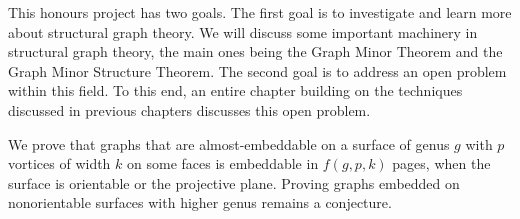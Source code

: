 This honours project has two goals. The first goal is to investigate and learn more about structural graph theory. We will discuss some important machinery in structural graph theory, the main ones being the Graph Minor Theorem and the Graph Minor Structure Theorem. The second goal is to address an open problem within this field. To this end, an entire chapter building on the techniques discussed in previous chapters discusses this open problem. 

We prove that graphs that are almost-embeddable on a surface of genus $g$ with $p$ vortices of width $k$ on some faces is embeddable in $f(g, p, k)$ pages, when the surface is orientable or the projective plane. Proving graphs embedded on nonorientable surfaces with higher genus remains a conjecture. 